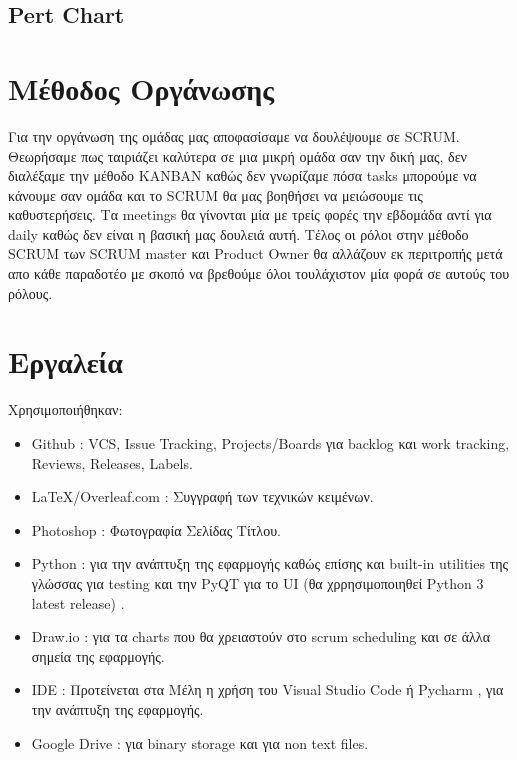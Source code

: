 \documentclass{article}
\begin{document}
\subsection{Pert Chart}

\begin{center}

 \clearpage
 
\end{center}

\section{Μέθοδος Οργάνωσης}
Για την οργάνωση της ομάδας μας αποφασίσαμε να δουλέψουμε σε SCRUM. Θεωρήσαμε πως ταιριάζει καλύτερα σε μια μικρή ομάδα σαν την δική μας, δεν διαλέξαμε την μέθοδο KANBAN καθώς δεν γνωρίζαμε πόσα tasks μπορούμε να κάνουμε σαν ομάδα και το SCRUM θα μας βοηθήσει να μειώσουμε τις καθυστερήσεις. Τα meetings θα γίνονται μία με τρείς φορές την εβδομάδα αντί για daily καθώς δεν είναι η βασική μας δουλειά αυτή. Τέλος οι ρόλοι στην μέθοδο SCRUM των SCRUM master και Product Owner θα αλλάζουν εκ περιτροπής μετά απο κάθε παραδοτέο με σκοπό να βρεθούμε όλοι τουλάχιστον μία φορά σε αυτούς του ρόλους.

\section{Εργαλεία}
Χρησιμοποιήθηκαν:
\begin{itemize}
    \item Github : VCS, Issue Tracking, Projects/Boards για backlog και work tracking, Reviews, Releases, Labels.
    \item \LaTeX/Overleaf.com : Συγγραφή των τεχνικών κειμένων.
    \item Photoshop : Φωτογραφία Σελίδας Τίτλου.
    \item Python : για την ανάπτυξη της εφαρμογής καθώς επίσης και built-in utilities της γλώσσας για testing και την PyQT για το UI (θα χρρησιμοποιηθεί Python 3 latest release) .
    \item Draw.io : για τα charts που θα χρειαστούν στο scrum scheduling και σε άλλα σημεία της εφαρμογής.
    \item IDE : Προτείνεται στα Mέλη η χρήση του Visual Studio Code ή Pycharm , για την ανάπτυξη της εφαρμογής.
    \item Google Drive : για binary storage και για non text files.
\end{itemize}
\end{document}
